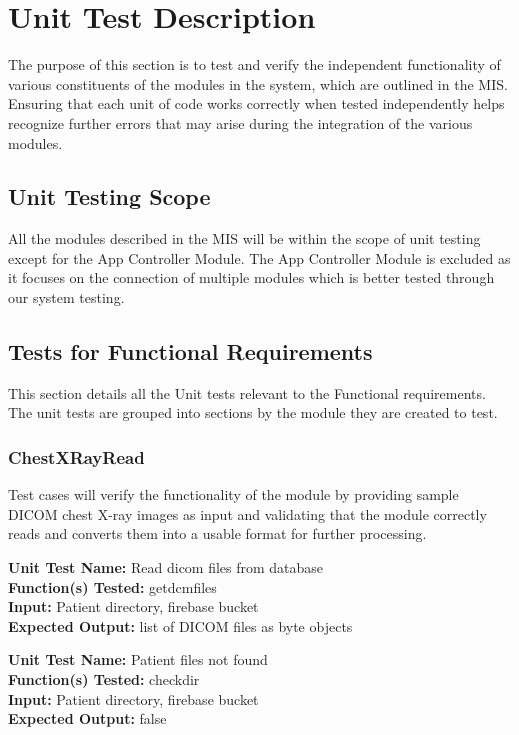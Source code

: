 \documentclass[12pt, titlepage]{article}
\begin{document}
\newpage

\section{Unit Test Description}
The purpose of this section is to test and verify the independent functionality of various constituents of the modules in the system, which are outlined in the MIS. Ensuring that each unit of code works correctly when tested independently helps recognize further errors that may arise during the integration of the various modules.

\subsection{Unit Testing Scope}
All the modules described in the MIS will be within the scope of unit testing except for the App Controller Module. The App Controller Module is excluded as it focuses on the connection of multiple modules which is better tested through our system testing. 

\subsection{Tests for Functional Requirements}
This section details all the Unit tests relevant to the Functional requirements. The unit tests are grouped into sections by the module they are created to test.  

\subsubsection{ChestXRayRead}
Test cases will verify the functionality of the module by providing sample DICOM chest X-ray images as input and validating that the module correctly reads and converts them into a usable format for further processing.

\begin{mdframed}[linewidth=0.5mm]
  \textbf{Unit Test Name:} Read dicom files from database \\
  \textbf{Function(s) Tested:} getdcmfiles \\
  \textbf{Input:} Patient directory, firebase bucket \\
  \textbf{Expected Output:} list of DICOM files as byte objects  
\end{mdframed}

\begin{mdframed}[linewidth=0.5mm]
  \textbf{Unit Test Name:} Patient files not found \\
  \textbf{Function(s) Tested:} checkdir \\
  \textbf{Input:} Patient directory, firebase bucket \\
  \textbf{Expected Output:} false  
\end{mdframed}
\end{document}
